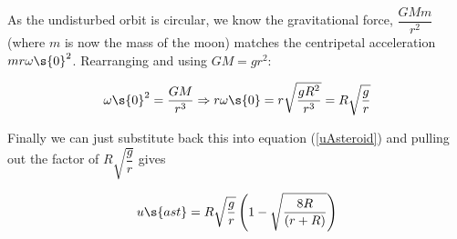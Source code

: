 \begin{problem}
{  As the undisturbed orbit is circular, we know the gravitational force, $\dfrac{GMm}{r^2}$ (where $m$ is now the mass of the moon) matches the centripetal acceleration $mr\omega\s{0}^2$. Rearranging and using $GM = gr^2$:
  
  \begin{equation*}
  \omega\s{0}^2 = \dfrac{GM}{r^3} \Rightarrow r\omega\s{0} = r\sqrt{ \dfrac{gR^2}{r^3}} = R \sqrt{\dfrac{g}{r}}
\end{equation*}

Finally we can just substitute back this into equation (\ref{uAsteroid}) and pulling out the factor of $R\sqrt{\dfrac{g}{r}}$ gives

 \begin{equation*}
 u\s{ast} = R \sqrt{\dfrac{g}{r}} \left(1 - \sqrt{\dfrac{8R}{(r + R)} } \right)
 \end{equation*}

}
\end{problem}